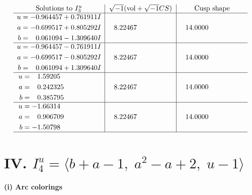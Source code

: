 \documentclass[1p]{elsarticle_modified}
\theoremstyle{definition}
\newcommand{\I}{\sqrt{-1}}
\begin{document}
$$\begin{array}{c|c|c}  
\text{Solutions to }I^u_{3}& \I (\text{vol} + \sqrt{-1}CS) & \text{Cusp shape}\\
 \hline 
\begin{aligned}
u &= -0.964457 + 0.761911 I \\
a &= -0.699517 + 0.805292 I \\
b &= \phantom{-}0.061094 - 1.309640 I\end{aligned}
 & \phantom{-}8.22467\phantom{ +0.000000I} & \phantom{-}14.0000\phantom{ +0.000000I} \\ \hline\begin{aligned}
u &= -0.964457 - 0.761911 I \\
a &= -0.699517 - 0.805292 I \\
b &= \phantom{-}0.061094 + 1.309640 I\end{aligned}
 & \phantom{-}8.22467\phantom{ +0.000000I} & \phantom{-}14.0000\phantom{ +0.000000I} \\ \hline\begin{aligned}
u &= \phantom{-}1.59205\phantom{ +0.000000I} \\
a &= \phantom{-}0.242325\phantom{ +0.000000I} \\
b &= \phantom{-}0.385795\phantom{ +0.000000I}\end{aligned}
 & \phantom{-}8.22467\phantom{ +0.000000I} & \phantom{-}14.0000\phantom{ +0.000000I} \\ \hline\begin{aligned}
u &= -1.66314\phantom{ +0.000000I} \\
a &= \phantom{-}0.906709\phantom{ +0.000000I} \\
b &= -1.50798\phantom{ +0.000000I}\end{aligned}
 & \phantom{-}8.22467\phantom{ +0.000000I} & \phantom{-}14.0000\phantom{ +0.000000I}\\
 \hline 
 \end{array}$$\newpage\newpage\renewcommand{\arraystretch}{1}
\centering \section*{IV. $I^u_{4}= \langle b+a-1,\;a^2- a+2,\;u-1 \rangle$}
\flushleft \textbf{(i) Arc colorings}\\
\end{document}
